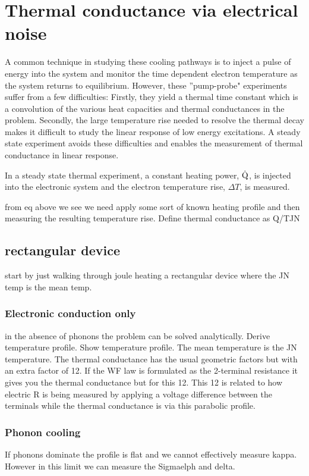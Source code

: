 \chapter{Thermal conductance via electrical noise}
\label{ch:thermal_conductance_via_electrical_noise}
A common technique in studying these cooling pathways is to inject a pulse of energy into the system and monitor the time dependent electron temperature as the system returns to equilibrium. However, these ''pump-probe" experiments suffer from a few difficulties: Firstly, they yield a thermal time constant which is a convolution of the various heat capacities and thermal conductances in the problem. Secondly, the large temperature rise needed to resolve the thermal decay makes it difficult to study the linear response of low energy excitations. A steady state experiment avoids these difficulties and enables the measurement of thermal conductance in linear response.

In a steady state thermal experiment, a constant heating power, $\dot{\mathrm{Q}}$, is injected into the electronic system and the electron temperature rise, $\Delta T$, is measured.


from eq above we see we need apply some sort of known heating profile and then measuring the resulting temperature rise. Define thermal conductance as Q/TJN

\section{rectangular device}
start by just walking through joule heating a rectangular device where the JN temp is the mean temp.

\subsection{Electronic conduction only}
in the absence of phonons the problem can be solved analytically. Derive temperature profile. Show temperature profile. The mean temperature is the JN temperature. The thermal conductance has the usual geometric factors but with an extra factor of 12. If the WF law is formulated as the 2-terminal resistance it gives you the thermal conductance but for this 12. This 12 is related to how electric R is being measured by applying a voltage difference between the terminals while the thermal conductance is via this parabolic profile.

\subsection{Phonon cooling}
If phonons dominate the profile is flat and we cannot effectively measure kappa. However in this limit we can measure the Sigmaelph and delta.

